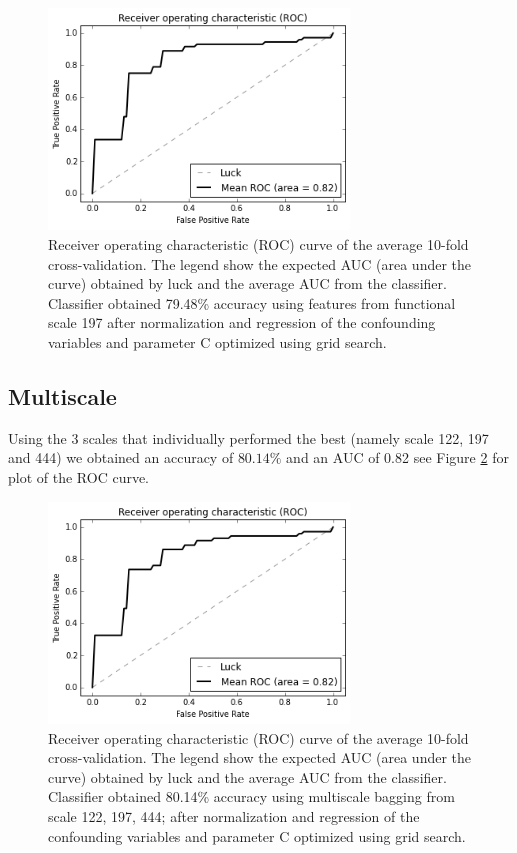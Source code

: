 \documentclass[12pt,journal,compsoc]{IEEEtran}
\begin{document}
\begin{figure}[h]
\centering
\includegraphics[width=8cm]{svc_linear_normalized_scale197x197.png}
\caption{Receiver operating characteristic (ROC) curve of the average 10-fold cross-validation. The legend show the expected AUC (area under the curve) obtained by luck and the average AUC from the classifier. Classifier obtained 79.48\% accuracy using features from functional scale 197 after normalization and regression of the confounding variables and parameter C optimized using grid search.}
\label{fig_svc_norm_optimal_scale}
\end{figure}

\subsection{Multiscale}

Using the 3 scales that individually performed the best (namely scale 122, 197 and 444) we obtained an accuracy of $80.14\%$ and an AUC of 0.82 see Figure \ref{fig_svc_bagging_multiscale} for plot of the ROC curve.


\begin{figure}[h]
\centering
\includegraphics[width=8cm]{svc_linear_multiscale_bagging.png}
\caption{Receiver operating characteristic (ROC) curve of the average 10-fold cross-validation. The legend show the expected AUC (area under the curve) obtained by luck and the average AUC from the classifier. Classifier obtained 80.14\% accuracy using multiscale bagging from scale 122, 197, 444; after normalization and regression of the confounding variables and parameter C optimized using grid search.}
\label{fig_svc_bagging_multiscale}
\end{figure}
\end{document}
